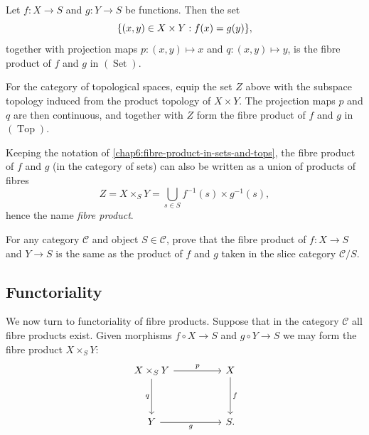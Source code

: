 \documentclass[12pt]{book}
\theoremstyle{definition}
\DeclarePairedDelimiter{\Set}{\lbrace}{\rbrace}
\newcommand{\Sets}{\operatorname{Set}}
\newcommand{\Tops}{\operatorname{Top}}
\begin{document}
	\begin{example}\label{chap6:fibre-product-in-sets-and-tops}
		Let $f \colon X \to S$ and $g \colon Y \to S$ be functions. Then the set
		\begin{equation*}
			\Set*{(x, y) \in X \times Y : f(x) = g(y)},
		\end{equation*}
		together with projection maps $p \colon (x, y) \mapsto x$ and $q \colon (x, y) \mapsto y$, is the fibre product of $f$ and $g$ in $(\Sets)$.
		
		For the category of topological spaces, equip the set $Z$ above with the subspace topology induced from the product topology of $X \times Y$. The projection maps $p$ and $q$ are then continuous, and together with $Z$ form the fibre product of $f$ and $g$ in $(\Tops)$.
	\end{example}
	
	Keeping the notation of \cref{chap6:fibre-product-in-sets-and-tops}, the fibre product of $f$ and $g$ (in the category of sets) can also be written as a union of products of fibres
	\begin{equation*}
		Z =	X \times_S Y = \bigcup_{s \in S} f^{-1}(s) \times g^{-1}(s),
	\end{equation*}
	hence the name \textit{fibre product}.
	
	\begin{exercise}
		For any category $\mathcal{C}$ and object $S \in \mathcal{C}$, prove that the fibre product of $f \colon X \to S$ and $Y \to S$ is the same as the product of $f$ and $g$ taken in the slice category $\mathcal{C}/S$.
	\end{exercise}
	
	\subsection*{Functoriality}
	
	We now turn to functoriality of fibre products. Suppose that in the category $\mathcal{C}$ all fibre products exist. Given morphisms $f \circ X \to S$ and $g \circ Y \to S$ we may form the fibre product $X \times_S Y$:
	\[\begin{tikzcd}
		{X \times_S Y} && X \\
		\\
		Y && {S.}
		\arrow["p", from=1-1, to=1-3]
		\arrow["q"', from=1-1, to=3-1]
		\arrow["f", from=1-3, to=3-3]
		\arrow["g"', from=3-1, to=3-3]
	\end{tikzcd}\]
	
\end{document}
